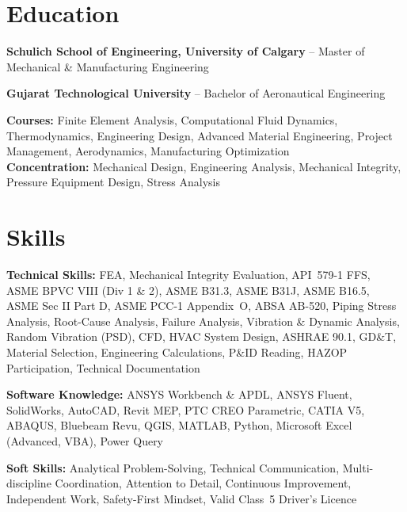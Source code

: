 \documentclass[10pt, letterpaper]{article}
\newcommand{\skillrow}[2]{\vspace{2pt}\textbf{#1: }#2\par}
\newcommand{\edurow}[2]{\vspace{3pt}\textbf{#1} {--} #2\par}
\begin{document}
\section*{Education}

\edurow{Schulich School of Engineering, University of Calgary}{Master of Mechanical \& Manufacturing Engineering}
\edurow{Gujarat Technological University}{Bachelor of Aeronautical Engineering}

{\small\color{black}\textbf{Courses:} Finite Element Analysis, Computational Fluid Dynamics, Thermodynamics, Engineering Design, Advanced Material Engineering, Project Management, Aerodynamics, Manufacturing Optimization}\\[2pt]
{\small\color{black}\textbf{Concentration:} Mechanical Design, Engineering Analysis, Mechanical Integrity, Pressure Equipment Design, Stress Analysis}

\section*{Skills}

\skillrow{Technical Skills}{FEA, Mechanical Integrity Evaluation, API~579-1 FFS, ASME BPVC VIII (Div 1 \& 2), ASME B31.3, ASME B31J, ASME B16.5, ASME Sec II Part D, ASME PCC-1 Appendix~O, ABSA AB-520, Piping Stress Analysis, Root-Cause Analysis, Failure Analysis, Vibration & Dynamic Analysis, Random Vibration (PSD), CFD, HVAC System Design, ASHRAE 90.1, GD\&T, Material Selection, Engineering Calculations, P\&ID Reading, HAZOP Participation, Technical Documentation}

\skillrow{Software Knowledge}{ANSYS Workbench \& APDL, ANSYS Fluent, SolidWorks, AutoCAD, Revit MEP, PTC CREO Parametric, CATIA V5, ABAQUS, Bluebeam Revu, QGIS, MATLAB, Python, Microsoft Excel (Advanced, VBA), Power Query}

\skillrow{Soft Skills}{Analytical Problem-Solving, Technical Communication, Multi-discipline Coordination, Attention to Detail, Continuous Improvement, Independent Work, Safety-First Mindset, Valid Class~5 Driver's Licence}
\end{document}
